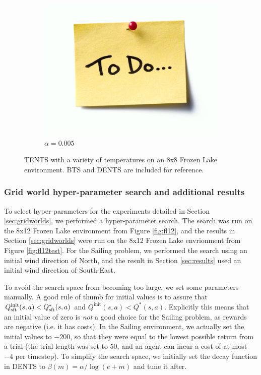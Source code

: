 \begin{figure}
\begin{subfigure}[b]{0.32\textwidth}
                    \centering
                    \includegraphics[width=\textwidth]{figures/todo.jpg}
                    \caption{$\alpha=0.005$}
                \end{subfigure}
                
                \caption{TENTS with a variety of temperatures on an 8x8 Frozen Lake environment. BTS and DENTS are included for reference.}
                \label{fig:fl_param_sens_tents}
            \end{figure}


            \FloatBarrier

        




    \subsubsection{Grid world hyper-parameter search and additional results} \label{app:hps}
        To select hyper-parameters for the experiments detailed in Section \ref{sec:gridworlds}, we performed a hyper-parameter search. The search was run on the 8x12 Frozen Lake environment from Figure \ref{fig:fl12}, and the results in Section \ref{sec:gridworlds} were run on the 8x12 Frozen Lake envrionment from Figure \ref{fig:fl12test}. For the Sailing problem, we performed the search using an initial wind direction of North, and the result in Section \ref{sec:results} used an initial wind direction of South-East.

        To avoid the search space from becoming too large, we set some parameters manually. A good rule of thumb for initial values is to assure that $Q^{\text{init}}_{\text{sft}}(s,a) < Q_{{\textnormal{sft}}}^*(s,a)$ and $Q^{\text{init}}(s,a) < Q^*(s,a)$. Explicitly this means that an initial value of zero is \textit{not} a good choice for the Sailing problem, as rewards are negative (i.e. it has costs). In the Sailing environment, we actually set the initial values to $-200$, so that they were equal to the lowest possible return from a trial (the trial length was set to $50$, and an agent can incur a cost of at most $-4$ per timestep). To simplify the search space, we initially set the decay function in DENTS to $\beta(m)=\alpha/\log(e+m)$ and tune it after. 

